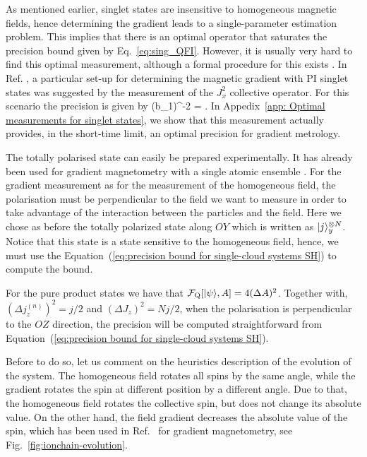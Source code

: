 As mentioned earlier, singlet states are insensitive
to homogeneous magnetic fields,
hence determining the gradient leads to a single-parameter
estimation problem.
This implies that there is an optimal operator that saturates the precision
bound given by Eq.~\eqref{eq:sing_QFI}.
However, it is usually very hard to find
this optimal measurement,
although a formal procedure for this exists \cite{Paris2009}.
In Ref. \cite{Urizar-lanz2013}, a particular set-up for determining the magnetic gradient
with PI singlet states was suggested by the measurement
of the $J_x^2$ collective operator.
 For this scenario the precision is given by
\be
\label{eq: Jx2_acc}
(\Delta b_1)^{-2}
= .
\ee
In Appedix~\ref{app: Optimal measurements for singlet states},
we  show that this measurement actually provides,
in the short-time limit, an optimal precision for gradient metrology.


The totally polarised state can easily be prepared experimentally.
It has already been used for gradient magnetometry with a single atomic ensemble \cite{Koschorreck2011,Vengalattore2007}.
For the gradient measurement as for the measurement of the homogeneous field, the polarisation must be perpendicular to the field we want to measure in order to take advantage of the interaction between the particles and the field.
Here we chose as before the totally polarized state along $OY$ which is written as $\vert j \rangle_y^{\otimes N}$.
Notice that this state is a state sensitive to the homogeneous field, hence, we must use the Equation~(\ref{eq:precision bound for single-cloud systems SH}) to compute the bound.

For the pure product states we have that $\mathcal{F}_{\text{Q}}[\vert \psi \rangle, A] = 4(\Delta A)^2$.
Together with,
$(\Delta j_z^{(n)})^2=j/2$ and $(\Delta J_z)^2=Nj/2$, when the polarisation is
perpendicular to the $OZ$ direction, the precision will be computed straightforward from Equation~(\ref{eq:precision bound for single-cloud systems SH}).

Before to do so, let us comment on the heuristics description of the evolution of the system.
The homogeneous field rotates all spins by the same angle, while the gradient rotates the spin at different position by a different angle.
Due to that, the homogeneous field rotates the collective spin, but does not change its absolute value.
On the other hand, the field gradient decreases the absolute value of the spin, which has been used in Ref.~\cite{Behbood2013} for gradient magnetometry, see Fig.~\ref{fig:ionchain-evolution}.


